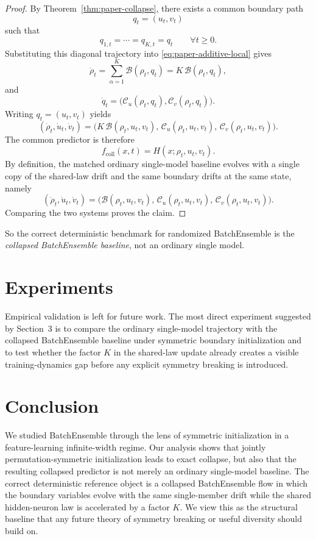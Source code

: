 \documentclass{article}
\begin{document}
\begin{proof}
By Theorem~\ref{thm:paper-collapse}, there exists a common boundary path
\[
q_t=(u_t,v_t)
\]
such that
\[
q_{1,t}=\cdots=q_{K,t}=q_t
\qquad
\forall t\ge 0.
\]
Substituting this diagonal trajectory into \eqref{eq:paper-additive-local} gives
\[
\dot\rho_t
=
\sum_{\alpha=1}^K \mathcal B(\rho_t,q_t)
=
K\,\mathcal B(\rho_t,q_t),
\]
and
\[
\dot q_t
=
\bigl(\mathcal C_u(\rho_t,q_t),\mathcal C_v(\rho_t,q_t)\bigr).
\]
Writing $q_t=(u_t,v_t)$ yields
\[
(\dot\rho_t,\dot u_t,\dot v_t)
=
\bigl(
K\,\mathcal B(\rho_t,u_t,v_t),\,
\mathcal C_u(\rho_t,u_t,v_t),\,
\mathcal C_v(\rho_t,u_t,v_t)
\bigr).
\]
The common predictor is therefore
\[
f_{\mathrm{coll}}(x,t)=H(x;\rho_t,u_t,v_t).
\]
By definition, the matched ordinary single-model baseline evolves with a single copy of the shared-law drift and the same boundary drifts at the same state, namely
\[
(\dot\rho_t,\dot u_t,\dot v_t)
=
\bigl(
\mathcal B(\rho_t,u_t,v_t),\,
\mathcal C_u(\rho_t,u_t,v_t),\,
\mathcal C_v(\rho_t,u_t,v_t)
\bigr).
\]
Comparing the two systems proves the claim.
\end{proof}

So the correct deterministic benchmark for randomized BatchEnsemble is the \emph{collapsed BatchEnsemble baseline}, not an ordinary single model.



\section{Experiments}

Empirical validation is left for future work. The most direct experiment suggested by Section~3 is to compare the ordinary single-model trajectory with the collapsed BatchEnsemble baseline under symmetric boundary initialization and to test whether the factor $K$ in the shared-law update already creates a visible training-dynamics gap before any explicit symmetry breaking is introduced.

\section{Conclusion}

We studied BatchEnsemble through the lens of symmetric initialization in a feature-learning infinite-width regime. Our analysis shows that jointly permutation-symmetric initialization leads to exact collapse, but also that the resulting collapsed predictor is not merely an ordinary single-model baseline. The correct deterministic reference object is a collapsed BatchEnsemble flow in which the boundary variables evolve with the same single-member drift while the shared hidden-neuron law is accelerated by a factor $K$. We view this as the structural baseline that any future theory of symmetry breaking or useful diversity should build on.
\end{document}

